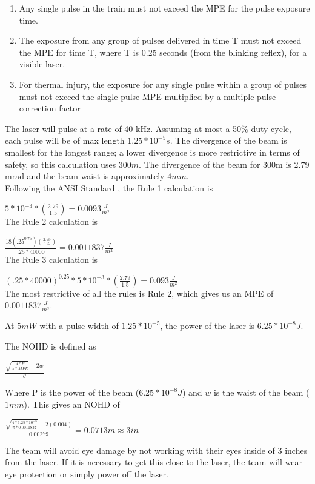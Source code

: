 \documentclass[openbib,letterpaper,10pt]{article}
\begin{document}
\begin{spacing}{1.15}
\begin{enumerate}
	\item Any single pulse in the train must not exceed the MPE for the pulse exposure time.
	\item The exposure from any group of pulses delivered in time T must not exceed the MPE for
	time T, where T is 0.25 seconds (from the blinking reflex), for a visible laser. 
	\item For thermal injury, the exposure for any single pulse within a group of pulses must not
	exceed the single-pulse MPE multiplied by a multiple-pulse correction factor
\end{enumerate}

The laser will pulse at a rate of 40 kHz. Assuming at most a 50\% duty cycle, each pulse will be of max length $1.25*10^{-5} s$. The divergence of the beam is smallest for the longest range; a lower divergence is more restrictive in terms of safety, so this calculation uses $300m$. The divergence of the beam for 300m is 2.79 mrad and the beam waist is approximately $4 mm$. \\

Following the ANSI Standard \cite{ANSI}, the Rule 1 calculation is 

{\large $5*10^{-3}*(\frac{2.79}{1.5})  = 0.0093 \frac{J}{m^2}$ }\\

The Rule 2 calculation is

{\large $\frac{18(.25^{0.75})(\frac{2.79}{1.5})}{.25*40000} = 0.0011837 \frac{J}{m^2}$ }\\

The Rule 3 calculation is

{\large $(.25*40000)^{0.25} * 5*10^{-3}*(\frac{2.79}{1.5}) = 0.093 \frac{J}{m^2}$ }\\

The most restrictive of all the rules is Rule 2, which gives us an MPE of $0.0011837 \frac{J}{m^2}$.

At $5mW$ with a pulse width of $1.25*10^{-5}$, the power of the laser is $6.25*10^{-8} J$. 

The NOHD is defined as

{\LARGE $ \frac{\sqrt{\frac{4 * P}{\pi * MPE}} - 2w}{\theta}$}

Where P is the power of the beam ($6.25*10^{-8} J$) and $w$ is the waist of the beam ($1mm$). This gives an NOHD of 

{\Large$ \frac{\sqrt{\frac{4 * 6.25*10^{-8}}{\pi * 0.0011837}} - 2(0.004)}{0.00279} = 0.0713 m \approx 3 in $}
	
The team will avoid eye damage by not working with their eyes inside of 3 inches from the laser. If it is necessary to get this close to the laser, the team will wear eye protection or simply power off the laser. 

\clearpage


\clearpage
\end{spacing}
\end{document}
